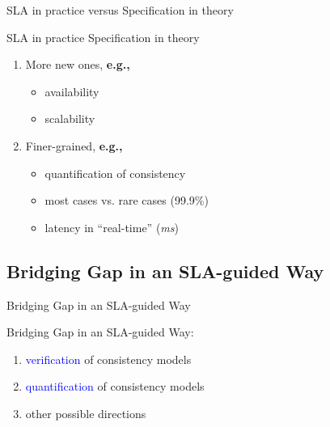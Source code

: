 \documentclass{beamer}
\newcommand{\largeblue}[1]{\textcolor{blue}{\large #1}}
\begin{document}
\begin{frame}{SLA in practice versus Specification in theory}
  \begin{block}{SLA in practice  Specification in theory}
    \begin{enumerate}
      \item More new ones, \textcolor{eggreen}{\bf e.g.,}
		\begin{itemize}
		  \item availability
		  \item scalability
		\end{itemize}
      \item Finer-grained, \textcolor{eggreen}{\bf e.g.,}
        \begin{itemize}
          \item quantification of consistency
          \item most cases vs. rare cases (99.9\%)
          \item latency in ``real-time'' ({\it ms})
        \end{itemize}
    \end{enumerate}
  \end{block}
\end{frame}
\subsection{Bridging Gap in an SLA-guided Way}

\begin{frame}{Bridging Gap in an SLA-guided Way}
  \begin{block}{Bridging Gap in an SLA-guided Way:}
    \begin{enumerate}
      \item \largeblue{verification} of consistency models
      \item \largeblue{quantification} of consistency models
      \item other possible directions
    \end{enumerate}
  \end{block}
\end{frame}
\end{document}
